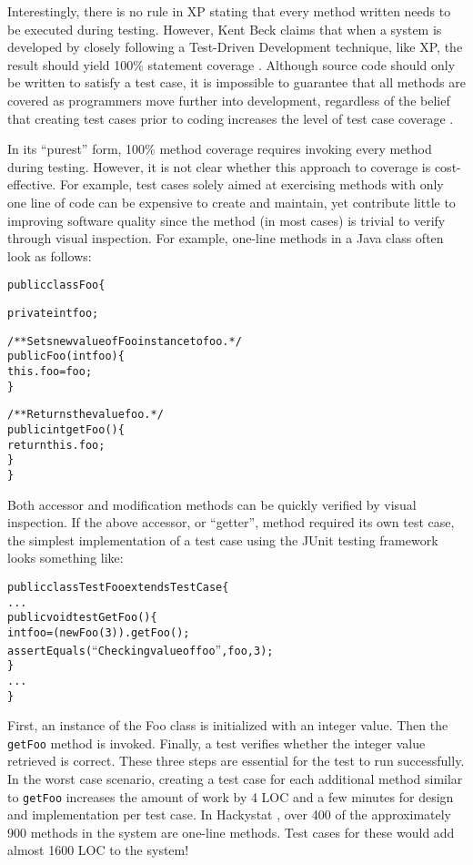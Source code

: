 Interestingly, there is no rule in XP stating that every method written
needs to be executed during testing.  However, Kent Beck claims that when a
system is developed by closely following a Test-Driven Development
technique, like XP, the result should yield 100\% statement coverage
\cite{Beck:2003}.  Although source code should only be written to satisfy a
test case, it is impossible to guarantee that all methods are covered as
programmers move further into development, regardless of the belief that
creating test cases prior to coding increases the level of test case
coverage \cite{Langr:2001}.

In its ``purest'' form, 100\% method coverage requires invoking every
method during testing.  However, it is not clear whether this approach to
coverage is cost-effective.  For example, test cases solely aimed at
exercising methods with only one line of code can be expensive to create
and maintain, yet contribute little to improving software quality since the
method (in most cases) is trivial to verify through visual inspection.  For
example, one-line methods in a Java class often look as follows:

\begin{alltt}
{\small{}public class Foo \{

  private int foo;

  /** Sets new value of Foo instance to foo. */
  public Foo(int foo) \{
    this.foo = foo;
  \}

  /** Returns the value foo. */
  public int getFoo() \{
    return this.foo;
  \}
\}
}
\end{alltt}
Both accessor and modification methods can be quickly verified by visual
inspection.  If the above accessor, or ``getter'', method required its own
test case, the simplest implementation of a test case using the JUnit
\cite{JUnit} testing framework looks something like:

\begin{alltt}
{\small{}public class TestFoo extends TestCase \{
  ...
  public void testGetFoo() \{
    int foo = (new Foo(3)).getFoo();
    assertEquals(``Checking value of foo'', foo, 3);
  \}
  ...
\}
}
\end{alltt}
First, an instance of the Foo class is initialized with an integer value.
Then the {\tt getFoo} method is invoked.  Finally, a test verifies whether
the integer value retrieved is correct.  These three steps are essential
for the test to run successfully.  In the worst case scenario, creating a
test case for each additional method similar to {\tt getFoo} increases the
amount of work by 4 LOC and a few minutes for design and implementation per
test case.  In Hackystat \cite{Hackystat}, over 400 of the approximately
900 methods in the system are one-line methods.  Test cases for these would
add almost 1600 LOC to the system!

